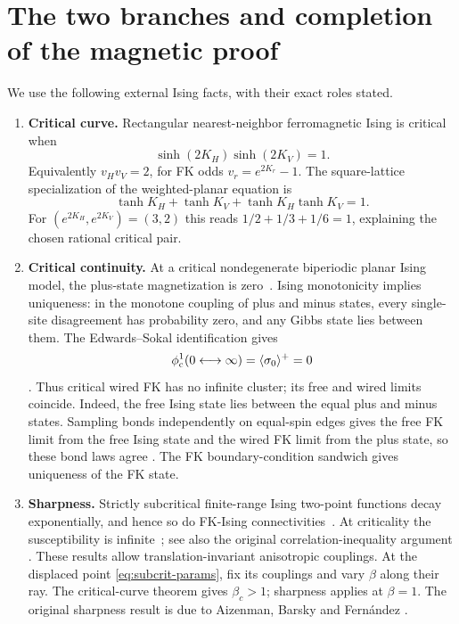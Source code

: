 \section{The two branches and completion of the magnetic proof}\label{sec:branches}

We use the following external Ising facts, with their exact roles stated.
\begin{enumerate}[label=(I\arabic*)]
\item \textbf{Critical curve.} Rectangular nearest-neighbor ferromagnetic Ising is critical when
\begin{equation}
 \sinh(2K_H)\sinh(2K_V)=1.
\end{equation}
Equivalently \(v_Hv_V=2\), for FK odds \(v_r=e^{2K_r}-1\). The square-lattice specialization of the weighted-planar equation \cite[Theorem 1.1]{CDC} is
\[
 \tanh K_H+\tanh K_V+\tanh K_H\tanh K_V=1.
\]
For $(e^{2K_H},e^{2K_V})=(3,2)$ this reads $1/2+1/3+1/6=1$, explaining the chosen rational critical pair.
\item \textbf{Critical continuity.} At a critical nondegenerate biperiodic planar Ising model, the plus-state magnetization is zero~\cite[Theorem 1.5]{DCLis}. Ising monotonicity implies uniqueness: in the monotone coupling of plus and minus states, every single-site disagreement has probability zero, and any Gibbs state lies between them. The Edwards--Sokal identification gives
\[
 \phi^1_{\mathrm c}(0\longleftrightarrow\infty)=\langle\sigma_0\rangle^+=0
\]
\cite[Theorems 4.91 and 5.17]{Grimmett}. Thus critical wired FK has no infinite cluster; its free and wired limits coincide. Indeed, the free Ising state lies between the equal plus and minus states. Sampling bonds independently on equal-spin edges gives the free FK limit from the free Ising state and the wired FK limit from the plus state, so these bond laws agree \cite[Theorem 4.91 and its following free-boundary remark]{Grimmett}. The FK boundary-condition sandwich \cite[Lemma 4.14, Theorem 4.19]{Grimmett} gives uniqueness of the FK state.
\item \textbf{Sharpness.} Strictly subcritical finite-range Ising two-point functions decay exponentially, and hence so do FK-Ising connectivities~\cite[Theorem 2.1 and Section 2.2, arXiv v3 numbering]{DCT}. At criticality the susceptibility is infinite~\cite[Proposition 2.2]{DCT}; see also the original correlation-inequality argument \cite{Simon80}. These results allow translation-invariant anisotropic couplings. At the displaced point \eqref{eq:subcrit-params}, fix its couplings and vary $\beta$ along their ray. The critical-curve theorem gives $\beta_c>1$; sharpness applies at $\beta=1$. The original sharpness result is due to Aizenman, Barsky and Fern\'andez \cite{ABF}.
\end{enumerate}

